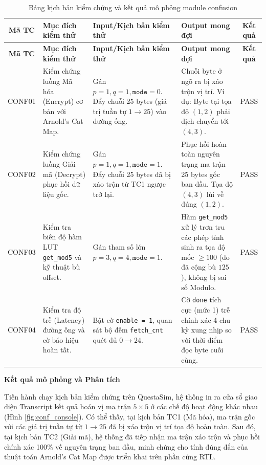 {
	\renewcommand{\arraystretch}{1.4}
	\begin{longtable}{|c|p{3.2cm}|p{3.6cm}|p{4.2cm}|c|}
		\caption{Bảng kịch bản kiểm chứng và kết quả mô phỏng module confusion}
		\label{bang_testcase_conf_tonghop} \\
		\hline
		\textbf{Mã TC} & \textbf{Mục đích kiểm thử} & \textbf{Input/Kịch bản kiểm thử} & \textbf{Output mong đợi} & \textbf{Kết quả} \\ \hline
		\endfirsthead
		
		\hline
		\textbf{Mã TC} & \textbf{Mục đích kiểm thử} & \textbf{Input/Kịch bản kiểm thử} & \textbf{Output mong đợi} & \textbf{Kết quả} \\ \hline
		\endhead
		
		CONF01 & Kiểm chứng luồng Mã hóa (Encrypt) cơ bản với Arnold's Cat Map. & Gán $p = 1, q = 1, \texttt{mode} = 0$. \newline Đẩy chuỗi 25 bytes (giá trị tuần tự $1 \rightarrow 25$) vào đường ống. & Chuỗi byte ở ngõ ra bị xáo trộn vị trí. \newline Ví dụ: Byte tại tọa độ $(1,2)$ phải dịch chuyển tới $(4,3)$. & PASS \\ \hline
		
		CONF02 & Kiểm chứng luồng Giải mã (Decrypt) phục hồi dữ liệu gốc. & Gán $p = 1, q = 1, \texttt{mode} = 1$. \newline Đẩy chuỗi 25 bytes đã bị xáo trộn từ TC1 ngược trở lại. & Phục hồi hoàn toàn nguyên trạng ma trận 25 bytes gốc ban đầu. Tọa độ $(4,3)$ lùi về đúng $(1,2)$. & PASS \\ \hline
		
		CONF03 & Kiểm tra biên độ hàm LUT \texttt{get\_mod5} và kỹ thuật bù offset. & Gán tham số lớn $p = 3, q = 4, \texttt{mode} = 1$. & Hàm \texttt{get\_mod5} xử lý trơn tru các phép tính sinh ra tọa độ mốc $\ge 100$ (do đã cộng bù $125$), không bị sai số Modulo. & PASS \\ \hline
		
		CONF04 & Kiểm tra độ trễ (Latency) đường ống và cờ báo hiệu hoàn tất. & Bật cờ \texttt{enable = 1}, quan sát bộ đếm \texttt{fetch\_cnt} quét đủ $0 \rightarrow 24$. & Cờ \texttt{done} tích cực (mức 1) trễ chính xác 4 chu kỳ xung nhịp so với thời điểm đọc byte cuối cùng. & PASS \\ \hline
	\end{longtable}
}
\textbf{Kết quả mô phỏng và Phân tích}

Tiến hành chạy kịch bản kiểm chứng trên QuestaSim, hệ thống in ra cửa sổ giao diện Transcript kết quả hoán vị ma trận $5 \times 5$ ở các chế độ hoạt động khác nhau (Hình \ref{fig:conf_console}). Có thể thấy, tại kịch bản TC1 (Mã hóa), ma trận gốc với các giá trị tuần tự từ $1 \rightarrow 25$ đã bị xáo trộn vị trí tọa độ hoàn toàn. Sau đó, tại kịch bản TC2 (Giải mã), hệ thống đã tiếp nhận ma trận xáo trộn và phục hồi chính xác 100\% về nguyên trạng ban đầu, minh chứng cho tính đúng đắn của thuật toán Arnold's Cat Map được triển khai trên phần cứng RTL.

